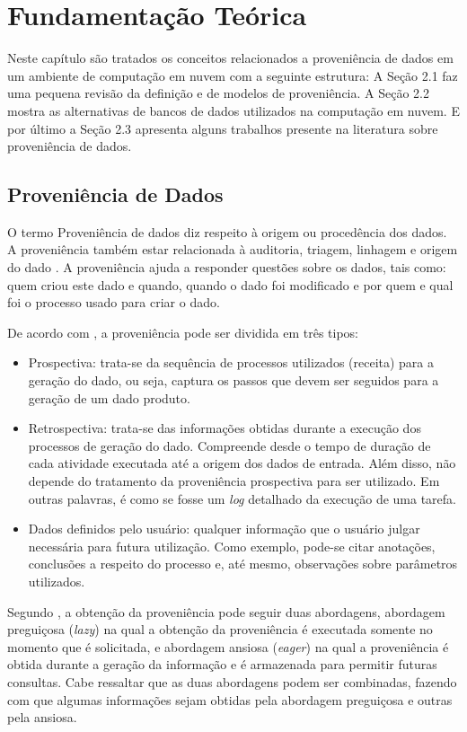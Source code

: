 
\chapter{Fundamentação Teórica}

Neste capítulo são tratados os conceitos relacionados a proveniência de dados em um ambiente de computação em nuvem com a seguinte estrutura: A Seção 2.1 faz uma pequena revisão da definição e de modelos de proveniência. A Seção 2.2 mostra as alternativas de bancos de dados utilizados na computação em nuvem. E por último a Seção 2.3 apresenta alguns trabalhos presente na literatura sobre proveniência de dados.

\section{Proveniência de Dados}

O termo Proveniência de dados diz respeito à origem ou procedência dos dados. A proveniência também estar relacionada à auditoria, triagem, linhagem e origem do dado \cite{davidson}. A proveniência ajuda a responder questões sobre os dados, tais como: quem criou este dado e quando, quando o dado foi modificado e por quem e qual foi o processo usado para criar o dado.

De acordo com \cite{davidson}, a proveniência pode ser dividida em três tipos:
\begin{itemize}
\item Prospectiva: trata-se da sequência de processos utilizados (receita) para a geração do dado, ou seja, captura os passos que devem ser seguidos para a geração de um dado produto.
\item Retrospectiva: trata-se das informações obtidas durante a execução dos processos de geração do dado. Compreende desde o tempo de duração de cada atividade executada até a origem dos dados de entrada. Além disso, não depende do tratamento da proveniência prospectiva para ser utilizado. Em outras palavras, é como se fosse um \textit{log} detalhado da execução de uma tarefa.
\item Dados definidos pelo usuário: qualquer informação que o usuário julgar necessária para futura utilização. Como exemplo, pode-se citar anotações, conclusões a respeito do processo e, até mesmo, observações sobre parâmetros utilizados.
\end{itemize}

Segundo \cite{tan}, a obtenção da proveniência pode seguir duas abordagens, abordagem preguiçosa (\textit{lazy}) na qual a obtenção da proveniência é executada somente no momento que é solicitada, e abordagem ansiosa (\textit{eager}) na qual a proveniência é obtida durante a geração da informação e é armazenada para permitir futuras consultas. Cabe ressaltar que as duas abordagens podem ser combinadas, fazendo com que algumas informações sejam obtidas pela abordagem preguiçosa e outras pela ansiosa.

